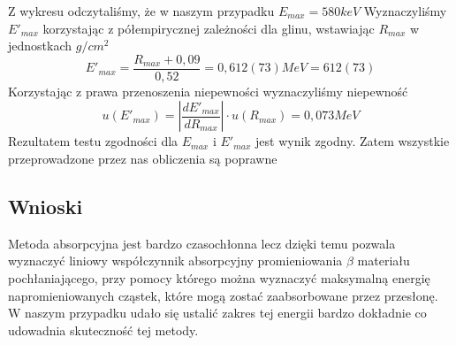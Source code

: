 \documentclass{article}
\begin{document}
\newpage
$$$$
Z wykresu odczytaliśmy, że w naszym przypadku $E_{max}=580keV$
Wyznaczyliśmy $E'_{max}$ korzystając z półempirycznej zależności dla glinu, wstawiając $R_{max}$ w jednostkach $g/cm^2$
$$E'_{max}=\frac{R_{max}+0,09}{0,52}=0,612(73)MeV=612(73)$$
Korzystając z prawa przenoszenia niepewności wyznaczyliśmy niepewność
$$u(E'_{max})=|\frac{dE'_{max}}{dR_{max}}|\cdot u(R_{max})=0,073MeV$$
Rezultatem testu zgodności dla $E_{max}$ i $E'_{max}$ jest wynik zgodny. Zatem wszystkie przeprowadzone przez nas obliczenia są poprawne
\subsection{Wnioski}
Metoda absorpcyjna jest bardzo czasochłonna lecz dzięki temu pozwala wyznaczyć liniowy współczynnik absorpcyjny promieniowania $\beta$ materiału pochłaniającego, przy pomocy którego można wyznaczyć maksymalną energię napromieniowanych cząstek, które mogą zostać zaabsorbowane przez przesłonę. W naszym przypadku udało się ustalić zakres tej energii bardzo dokładnie co udowadnia skuteczność tej metody.
\end{document}
